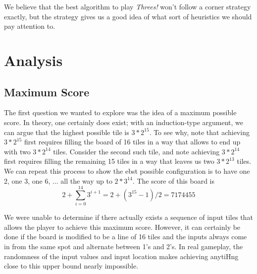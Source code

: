 \documentclass[11pt]{article}
\begin{document}
We believe that the best algorithm to play \emph{Threes!} won't follow a corner strategy exactly, but the strategy gives us a good idea of what sort of heuristics we should pay attention to.

\section{Analysis}

\subsection{Maximum Score}

The first question we wanted to explore was the idea of a maximum possible score. In theory, one certainly does exist; with an induction-type argument, we can argue that the highest possible tile is $3*2^{15}$. To see why, note that achieving $3*2^{15}$ first requires filling the board of 16 tiles in a way that allows to end up with two $3*2^{14}$ tiles. Consider the second such tile, and note achieving $3*2^{14}$ first requires filling the remaining 15 tiles in a way that leaves us two $3*2^{13}$ tiles. We can repeat this process to show the ebst possible configuration is to have one 2, one 3, one 6, ... all the way up to $2*3^{14}$. The score of this board is
\[ 2 + \sum_{i=0}^{14} 3^{i+1} = 2 + (3^{15}-1)/2 = 7174455 \]

We were unable to determine if there actually exists a sequence of input tiles that allows the player to achieve this maximum score. However, it can certainly be done if the board is modified to be a line of 16 tiles and the inputs always come in from the same spot and alternate between 1's and 2's. In real gameplay, the randomness of the input values and input location makes achieving anytiHng close to this upper bound nearly impossible.
\end{document}
